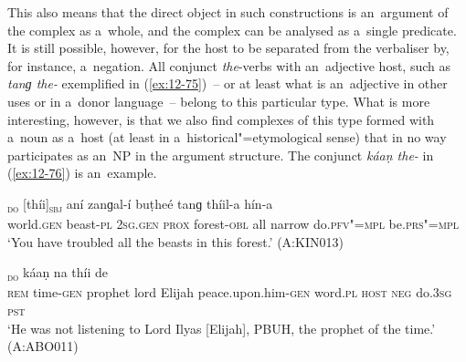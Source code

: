 This also means that the direct object in such constructions is an~argument of the complex as a~whole, and the complex can be analysed as a~single predicate. It is still possible, however, for the host to be separated from the verbaliser by, for instance, a~negation. All conjunct \textit{the}-verbs with an~adjective host, such as \textit{tanɡ the-} exemplified in (\ref{ex:12-75})~-- or at least what is an~adjective in other uses or in a~donor language~-- belong to this particular type. What is more interesting, however, is that we also find complexes of this type formed with a~noun as a~host (at least in a~historical"=etymological sense) that in no way participates as an~NP in the argument structure. The conjunct \textit{káaṇ the-} in (\ref{ex:12-76}) is an~example. 

\begin{exe}
\ex
\label{ex:12-75}
\textsubscript{\textsc{do}} [thíi]\textsubscript{\textsc{sbj}} aní zanɡal-í buṭheé tanɡ thíil-a hín-a \\
world.\textsc{gen} beast-\textsc{pl} \textsc{2sg.gen} \textsc{prox} forest-\textsc{obl} all  narrow do.\textsc{pfv"=mpl} be.\textsc{prs"=mpl} \\
\glt `You have troubled all the beasts in this forest.' (A:KIN013)

\ex
\label{ex:12-76}
\textsubscript{\textsc{do}} káaṇ na thíi de \\
\textsc{rem} time-\textsc{gen} prophet lord Elijah peace.upon.him-\textsc{gen} word.\textsc{pl} \textsc{host} \textsc{neg} do.\textsc{3sg} \textsc{pst} \\
\glt `He was not listening to Lord Ilyas [Elijah], PBUH, the prophet of the time.' (A:ABO011)
\end{exe}

